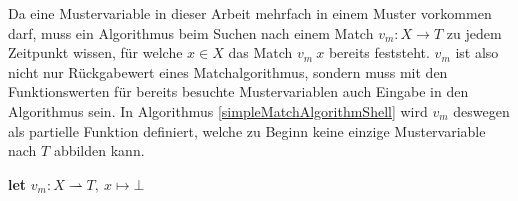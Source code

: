 \documentclass{scrartcl}
\numberwithin{figure}{section} %
\theoremstyle{definition} %
\begin{document}
Da eine Mustervariable in dieser Arbeit mehrfach in einem Muster vorkommen darf, muss ein Algorithmus beim Suchen nach einem Match $v_m \colon X \rightarrow T$ zu jedem Zeitpunkt wissen, für welche $x \in X$ das Match $v_m~x$ bereits feststeht. $v_m$ ist also nicht nur Rückgabewert eines Matchalgorithmus, sondern muss mit den Funktionswerten für bereits besuchte Mustervariablen auch Eingabe in den Algorithmus sein. In Algorithmus \ref{simpleMatchAlgorithmShell} wird $v_m$ deswegen als partielle Funktion definiert, welche zu Beginn keine einzige Mustervariable nach $T$ abbilden kann. \\

\begin{algorithm}
\DontPrintSemicolon
\caption{$\mathrm{simpleMatchAlgorithmShell} \colon M \times T \rightarrow (B, X \rightharpoonup T)$}\label{simpleMatchAlgorithmShell}

\textbf{let} $v_m \colon X \rightharpoonup T,~ x \mapsto \bot$\;
\end{algorithm}

\begin{algorithm}
\DontPrintSemicolon
\caption{$\mathrm{simpleMatchAlgorithm} \colon M \times T \times (X \rightharpoonup T) \rightarrow (B, X \rightharpoonup T)$}\label{simpleMatchAlgorithm}

 {
}
\end{algorithm}
\end{document}
